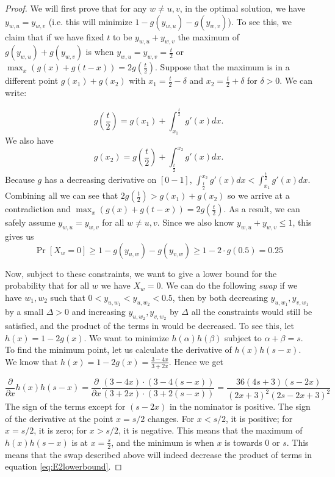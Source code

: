 \documentclass[letterpaper,11pt]{article}
\begin{document}
\begin{proof}
We will first prove that for any $w\neq u, v$, in the optimal solution, we have $y_{w, u} = y_{w, v}$ (i.e. this will minimize $1 - g(y_{w, u}) - g(y_{w, v})$). To see this, we claim that if we have fixed $t$ to be $y_{w, u} + y_{w, v}$ the maximum of $g(y_{w, u}) + g(y_{w, v})$ is when  $y_{w, u} = y_{w, v} = \frac{t}{2}$ or $\max_x (g(x) + g(t - x)) = 2g(\frac{t}{2})$.
Suppose that the maximum is in a different point $g(x_1) + g(x_2)$ with $x_1 = \frac{t}{2} - \delta$ and $x_2 = \frac{t}{2} + \delta$ for $\delta > 0$. We can write:

$$g(\frac{t}{2}) = g(x_1) + \int_{x_1}^{\frac{t}{2}} g'(x) dx.$$ 
We also have $$g(x_2) = g(\frac{t}{2}) + \int_{\frac{t}{2}}^{x_2} g'(x) dx.$$ 
Because $g$ has a decreasing derivative on $[0-1]$, 
$\int_{\frac{t}{2}}^{x_2} g'(x) dx < \int_{x_1}^{\frac{t}{2}} g'(x) dx$. Combining all we can see that $2g(\frac{t}{2}) > g(x_1) + g(x_2)$ so we arrive at a contradiction and $\max_x (g(x) + g(t - x)) = 2g(\frac{t}{2})$. As a result, we can safely assume  $y_{w, u} = y_{w, v}$ for all $w\neq u,v$. 
Since we also know $y_{w,u} +y_{w, v}  \leq 1$, this gives us  $$\Pr[X_w = 0] \geq 1 - g(y_{u, w}) - g(y_{v, w}) \geq 1 - 2 \cdot g(0.5) = 0.25$$ 

Now, subject to these constraints, we want to give a lower bound for the probability that for all $w$ we have $X_w = 0$. We can do the following \emph{swap} if we have $w_1, w_2$ such that $0 < y_{u, w_1} < y_{u, w_2} < 0.5$, then by both decreasing $y_{u, w_1}, y_{v, w_1}$ by a small $\Delta>0$ and increasing $y_{u, w_2}, y_{v, w_2}$ by $\Delta$ all the constraints would still be satisfied, and the product of the terms in  would be decreased. 
To see this, let $h(x) = 1 - 2g(x)$. We want to minimize $h(\alpha) h(\beta)$ subject to $\alpha + \beta = s$. To find the minimum point, let us calculate the derivative of $h(x) h(s - x)$.
We know that $h(x) = 1 - 2g(x) = \frac{3 - 4x}{3 + 2x}$. Hence we get 

$$\frac{\partial}{\partial x} h(x) h(s - x) = \frac{\partial}{\partial x} \frac{(3 - 4x) \cdot (3 - 4(s - x))}
{(3 + 2x)\cdot(3 + 2(s - x))} = \frac{36 (4s + 3)(s - 2x)}{(2x + 3)^2 (2s-2x+3)^2}$$
The sign of the terms except for $(s - 2x)$ in the nominator is positive. The sign of the derivative at the point $x = s/2$ changes. For $x < s/2$, it is positive; for $x = s/2$, it is zero; for $x > s/2$, it is negative. This means that the maximum of $h(x)h(s-x)$ is at $x = \frac{s}{2}$, and the minimum is when $x$ is towards $0$ or $s$. This means that the swap described above will indeed decrease the product of terms in equation \eqref{eq:E2lowerbound}.



\end{proof}
\end{document}
